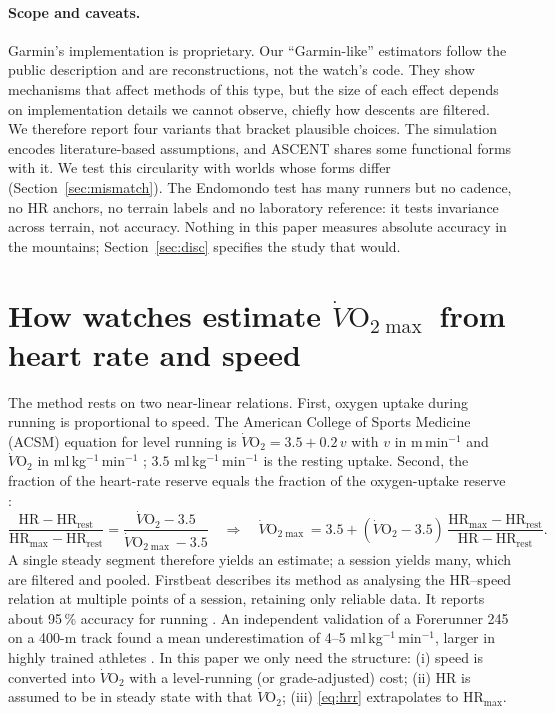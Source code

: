 \documentclass[11pt,a4paper]{article}
\newcommand{\VO}{\ensuremath{\dot V\mathrm{O}_2}}
\newcommand{\VOmax}{\ensuremath{\dot V\mathrm{O}_{2\max}}}
\newcommand{\unit}{ml\,kg$^{-1}$\,min$^{-1}$}
\newcommand{\HRmax}{\ensuremath{\mathrm{HR}_{\max}}}
\newcommand{\HRrest}{\ensuremath{\mathrm{HR}_{\mathrm{rest}}}}
\newcommand{\ascent}{ASCENT}
\begin{document}
\paragraph{Scope and caveats.} Garmin's implementation is proprietary. Our ``Garmin-like'' estimators follow the public description and are reconstructions, not the watch's code. They show mechanisms that affect methods of this type, but the size of each effect depends on implementation details we cannot observe, chiefly how descents are filtered. We therefore report four variants that bracket plausible choices. The simulation encodes literature-based assumptions, and \ascent{} shares some functional forms with it. We test this circularity with worlds whose forms differ (Section~\ref{sec:mismatch}). The Endomondo test has many runners but no cadence, no HR anchors, no terrain labels and no laboratory reference: it tests invariance across terrain, not accuracy. Nothing in this paper measures absolute accuracy in the mountains; Section~\ref{sec:disc} specifies the study that would.

\section{How watches estimate \texorpdfstring{\VOmax{}}{VO2max} from heart rate and speed}\label{sec:background}

The method rests on two near-linear relations. First, oxygen uptake during running is proportional to speed. The American College of Sports Medicine (ACSM) equation for level running is $\VO = 3.5 + 0.2\,v$ with $v$ in m\,min$^{-1}$ and \VO{} in \unit{} \citep{acsm2021}; $3.5$ \unit{} is the resting uptake. Second, the fraction of the heart-rate reserve equals the fraction of the oxygen-uptake reserve \citep{swain1997}:
\begin{equation}
\frac{\mathrm{HR}-\HRrest}{\HRmax-\HRrest}=\frac{\VO-3.5}{\VOmax-3.5}
\quad\Longrightarrow\quad
\VOmax = 3.5 + (\VO-3.5)\,\frac{\HRmax-\HRrest}{\mathrm{HR}-\HRrest}.
\label{eq:hrr}
\end{equation}
A single steady segment therefore yields an estimate; a session yields many, which are filtered and pooled. Firstbeat describes its method as analysing the HR--speed relation at multiple points of a session, retaining only reliable data. It reports about 95\,\% accuracy for running \citep{firstbeat2014}. An independent validation of a Forerunner 245 on a 400-m track found a mean underestimation of 4--5 \unit, larger in highly trained athletes \citep{engel2026}. In this paper we only need the structure: (i) speed is converted into \VO{} with a level-running (or grade-adjusted) cost; (ii) HR is assumed to be in steady state with that \VO; (iii) \eqref{eq:hrr} extrapolates to \HRmax.
\end{document}
